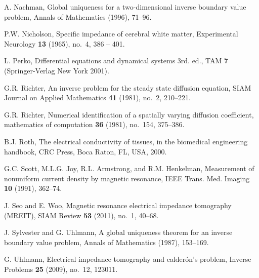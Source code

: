 \documentclass[11pt]{amsart}
\theoremstyle{plain}
\theoremstyle{remark}
\numberwithin{equation}{section}
\numberwithin{Thm}{section}
\begin{document}
\begin{thebibliography}{10}
A. Nachman, {Global uniqueness for a two-dimensional inverse boundary
  value problem}, Annals of Mathematics (1996), 71--96.

P.W. Nicholson, {Specific impedance of cerebral white matter},
  Experimental Neurology \textbf{13} (1965), no.~4, 386 -- 401.

        {L. Perko}, 
        {Differential equations and dynamical systems 3rd. ed.}, 
        TAM {\bf 7} (Springer-Verlag New York 2001).
 
  
G.R. Richter, {An inverse problem for the steady state diffusion
  equation}, {SIAM} Journal on Applied Mathematics \textbf{41} (1981), no.~2,
  210--221.

G.R. Richter, {Numerical identification of a spatially varying diffusion
  coefficient}, mathematics of computation \textbf{36} (1981), no.~154,
  375--386.

B.J. Roth, {The electrical conductivity of tissues, in the biomedical
  engineering handbook}, CRC Press, Boca Raton, FL, USA, 2000.

G.C. Scott, M.L.G. Joy, R.L. Armstrong, and R.M. Henkelman, {Measurement
  of nonuniform current density by magnetic resonance}, IEEE Trans. Med.
  Imaging \textbf{10} (1991), 362--74.

J. Seo and E. Woo, {Magnetic resonance electrical impedance
  tomography ({MREIT})}, {SIAM} Review \textbf{53} (2011), no.~1, 40--68.

J. Sylvester and G. Uhlmann, {A global uniqueness theorem for an inverse
  boundary value problem}, Annals of Mathematics (1987), 153--169.

G. Uhlmann, {Electrical impedance tomography and calderón's problem},
  Inverse Problems \textbf{25} (2009), no.~12, 123011.

\end{thebibliography}
\end{document}
